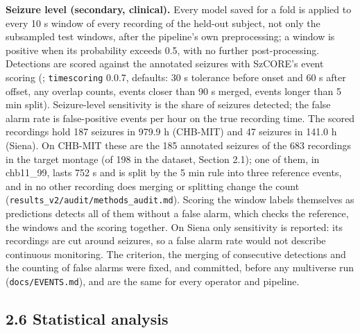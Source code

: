 \documentclass[11pt,a4paper]{article}
\begin{document}
\textbf{Seizure level (secondary, clinical).} Every model saved for a fold is applied to
every 10 s window of every recording of the held-out subject, not only the subsampled
test windows, after the pipeline's own preprocessing; a window is positive when its
probability exceeds 0.5, with no further post-processing. Detections are scored
against the annotated seizures with SzCORE's event scoring (\citealp{Dan_2024};
\nolinkurl{timescoring} 0.0.7, defaults: 30 s tolerance before onset and 60 s after offset, any
overlap counts, events closer than 90 s merged, events longer than 5 min split).
Seizure-level sensitivity is the share of seizures detected; the false alarm rate is
false-positive events per hour on the true recording time. The scored recordings hold
187 seizures in 979.9 h (CHB-MIT) and 47 seizures in 141.0 h (Siena). On CHB-MIT these
are the 185 annotated seizures of the 683 recordings in the target montage (of 198 in
the dataset, Section 2.1); one of them, in chb11\_99, lasts 752 s and is split by the
5 min rule into three reference events, and in no other recording does merging or
splitting change the count (\nolinkurl{results_v2/audit/methods_audit.md}). Scoring the
window labels themselves as predictions detects all of them without a false alarm,
which checks the reference, the windows and the scoring together. On Siena only
sensitivity is reported: its recordings are cut around seizures, so a false alarm
rate would not describe continuous monitoring. The criterion, the merging of
consecutive detections and the counting of false alarms were fixed, and committed,
before any multiverse run (\nolinkurl{docs/EVENTS.md}), and are the same for every operator and
pipeline.

\subsection{2.6 Statistical analysis}\label{statistical-analysis}
\end{document}
